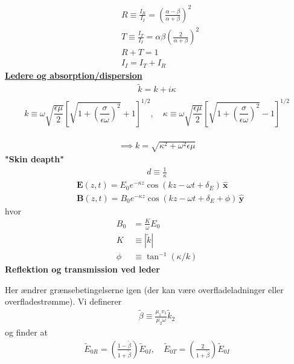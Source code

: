 \documentclass[a4paper]{article}
\begin{document}
    \begin{align*}
        &R \equiv \frac{I_R}{I_I} = \left( \frac{\alpha - \beta }{\alpha + \beta } \right) ^{2} \tag{9.116}\\
        &T \equiv \frac{I_T}{I_I} = \alpha  \beta \left( \frac{2}{\alpha + \beta } \right) ^{2} \tag{9.117}\\
        &R + T = 1\\
        &I_I = I_T + I_R \tag{9.118}
    \end{align*}
    \underline{\textbf{Ledere og absorption/dispersion}}
    \begin{align*}
        \tilde{k} = k + i \kappa \tag{9.127}\\
    \end{align*} 
    \[
    k \equiv \omega \sqrt{\frac{\epsilon \mu}{2}} 
    \left[ \sqrt{1 + \left( \frac{\sigma}{\epsilon \omega} \right)^2} + 1 \right]^{1/2}, \quad
    \kappa \equiv \omega \sqrt{\frac{\epsilon \mu}{2}} 
    \left[ \sqrt{1 + \left( \frac{\sigma}{\epsilon \omega} \right)^2} - 1 \right]^{1/2} \tag{9.128}
    \]\\
    \begin{align*}
        \implies k = \sqrt{\kappa ^{2} + \omega ^{2} \epsilon \mu } 
    \end{align*}
    \textbf{"Skin deapth"} 
    \begin{align*}
        d \equiv \frac{1}{\kappa } \tag{9.130}
    \end{align*}
    \begin{align*}
        &\boxed{\mathbf{E}(z, t) = E_0 e^{-\kappa z} \cos(kz - \omega t + \delta_E) \, \hat{\mathbf{x}}}\tag{9.140}\\
        &\boxed{\mathbf{B}(z, t) = B_0 e^{-\kappa z} \cos(kz - \omega t + \delta_E + \phi) \, \hat{\mathbf{y}}}
    \end{align*}
    hvor
    \begin{align*}
        B_0 &= \frac{K}{\omega } E_0 \tag{9.139}\\
        K &\equiv |\tilde{k}| \tag{9.134}\\
        \phi &\equiv \tan ^{-1} \left( \kappa / k \right)  \tag{9.136}
    \end{align*}
    \textbf{Reflektion og transmission ved leder}
    
    Her ændrer grænsebetingelserne igen (der kan være overfladeladninger eller overfladestrømme). Vi definerer \begin{align*}
        \tilde{\beta } \equiv \frac{\mu _1 v_1}{\mu _2 \omega } \tilde{k}_2 \tag{9.148}
    \end{align*}
    og finder at \begin{align*}
        \tilde{E}_{0R} = \left( \frac{1 - \tilde{\beta}}{1 + \tilde{\beta}} \right) \tilde{E}_{0I}, \quad
        \tilde{E}_{0T} = \left( \frac{2}{1 + \tilde{\beta}} \right) \tilde{E}_{0I} \tag{9.149}
    \end{align*}
\end{document}
